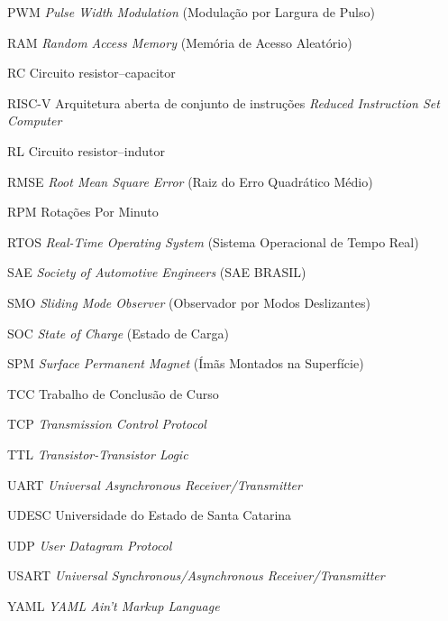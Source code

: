 \begin{siglas}
	\item[PWM] \textit{Pulse Width Modulation} (Modulação por Largura de Pulso)
	\item[RAM] \textit{Random Access Memory} (Memória de Acesso Aleatório)
	\item[RC] Circuito resistor--capacitor
	\item[RISC-V] Arquitetura aberta de conjunto de instruções \textit{Reduced Instruction Set Computer}
	\item[RL] Circuito resistor--indutor
	\item[RMSE] \textit{Root Mean Square Error} (Raiz do Erro Quadrático Médio)
	\item[RPM] Rotações Por Minuto
	\item[RTOS] \textit{Real-Time Operating System} (Sistema Operacional de Tempo Real)
	\item[SAE] \textit{Society of Automotive Engineers} (SAE BRASIL)
	\item[SMO] \textit{Sliding Mode Observer} (Observador por Modos Deslizantes)
	\item[SOC] \textit{State of Charge} (Estado de Carga)
	\item[SPM] \textit{Surface Permanent Magnet} (Ímãs Montados na Superfície)
	\item[TCC] Trabalho de Conclusão de Curso
	\item[TCP] \textit{Transmission Control Protocol}
	\item[TTL] \textit{Transistor-Transistor Logic}
	\item[UART] \textit{Universal Asynchronous Receiver/Transmitter}
	\item[UDESC] Universidade do Estado de Santa Catarina
	\item[UDP] \textit{User Datagram Protocol}
	\item[USART] \textit{Universal Synchronous/Asynchronous Receiver/Transmitter}
	\item[YAML] \textit{YAML Ain't Markup Language}
\end{siglas}

